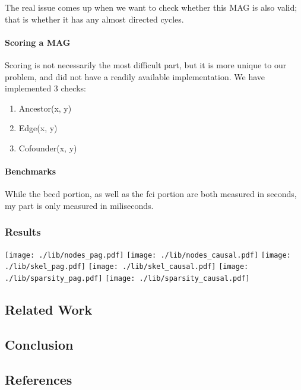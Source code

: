 \documentclass[
]{article}
\providecommand{\tightlist}{%
  \setlength{\itemsep}{0pt}\setlength{\parskip}{0pt}}
\begin{document}
The real issue comes up when we want to check whether this MAG is also
valid; that is whether it has any almost directed cycles.

\hypertarget{scoring-a-mag}{%
\paragraph{Scoring a MAG}\label{scoring-a-mag}}

Scoring is not necessarily the most difficult part, but it is more
unique to our problem, and did not have a readily available
implementation. We have implemented 3 checks:

\begin{enumerate}
\def\labelenumi{\arabic{enumi}.}
\tightlist
\item
  Ancestor(x, y)
\item
  Edge(x, y)
\item
  Cofounder(x, y)
\end{enumerate}

\hypertarget{benchmarks}{%
\paragraph{Benchmarks}\label{benchmarks}}

While the bccd portion, as well as the fci portion are both measured in
seconds, my part is only measured in miliseconds.

\hypertarget{results}{%
\subsubsection{Results}\label{results}}

\texttt{[image: ./lib/nodes\_pag.pdf]}
\texttt{[image: ./lib/nodes\_causal.pdf]}
\texttt{[image: ./lib/skel\_pag.pdf]}
\texttt{[image: ./lib/skel\_causal.pdf]}
\texttt{[image: ./lib/sparsity\_pag.pdf]}
\texttt{[image: ./lib/sparsity\_causal.pdf]}

\hypertarget{related-work}{%
\subsection{Related Work}\label{related-work}}

\hypertarget{conclusion}{%
\subsection{Conclusion}\label{conclusion}}

\hypertarget{references}{%
\subsection{References}\label{references}}
\end{document}
